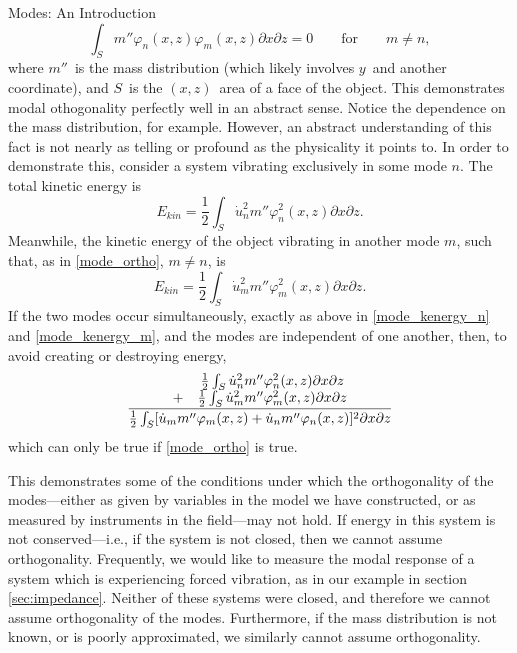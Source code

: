 \documentclass[a4paper,10pt]{report}
\numberwithin{equation}{section}
\begin{document}
{\begin{chapter}
\begin{section}{Modes: An Introduction}
\begin{equation}
\int_S m'' \varphi_n(x,z) \varphi_m(x,z) \partial x \partial z = 0 \qquad \text{for} \qquad m \neq n ,
\end{equation}
where $m''$\  is the mass distribution (which likely involves $y$\  and another coordinate), and $S$\  is the $(x, z)$\  area of a face of the object. This demonstrates modal othogonality perfectly well in an abstract sense. Notice the dependence on the mass distribution, for example. However, an abstract understanding of this fact is not nearly as telling or profound as the physicality it points to. In order to demonstrate this, consider a system vibrating exclusively in some mode $n$. The total kinetic energy is \cite[p.~320]{Cremer1973}
\begin{equation}
E_{kin} = \frac{1}{2} \int_S \dot{u}_n^2 m'' \varphi_n^2(x, z) \partial x \partial z \text{.}
\end{equation}
Meanwhile, the kinetic energy of the object vibrating in another mode $m$, such that, as in \eqref{mode_ortho}, $m \neq n$, is
\begin{equation}
E_{kin} = \frac{1}{2} \int_S \dot{u}_m^2 m'' \varphi_m^2(x, z) \partial x \partial z \text{.}
\end{equation}
If the two modes occur simultaneously, exactly as above in \eqref{mode_kenergy_n} and \eqref{mode_kenergy_m}, and the modes are independent of one another, then, to avoid creating or destroying energy,
\begin{align}
\frac{
\begin{array}{c c}
&\frac{1}{2} \int_S \dot{u}_n^2 m'' \varphi_n^2(x, z) \partial x \partial z\\
+ &\frac{1}{2} \int_S \dot{u}_m^2 m'' \varphi_m^2(x, z) \partial x \partial z 
\end{array}
}{
\frac{1}{2}  \int_S [\dot{u}_m m'' \varphi_m(x, z) + \dot{u}_n m'' \varphi_n(x, z) ]^2 \partial x \partial z  
}
\end{align}
which can only be true if \eqref{mode_ortho} is true. \cite[p.~322]{Cremer1973}
\par
This demonstrates some of the conditions under which the orthogonality of the modes---either as given by variables in the model we have constructed, or as measured by instruments in the field---may not hold. If energy in this system is not conserved---i.e., if the system is not closed, then we cannot assume orthogonality. Frequently, we would like to measure the modal response of a system which is experiencing forced vibration, as in our example in section \ref{sec:impedance}. Neither of these systems were closed, and therefore we cannot assume orthogonality of the modes. Furthermore, if the mass distribution is not known, or is poorly approximated, we similarly cannot assume orthogonality. 

\end{section}
\end{chapter}}
\end{document}
